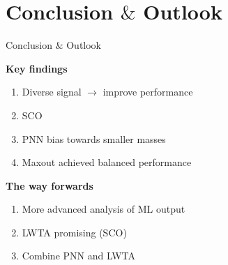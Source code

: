 \documentclass[UKenglish]{beamer}
\begin{document}
\section{Conclusion $\&$ Outlook}
\begin{frame}{Conclusion $\&$ Outlook}
    \tableofcontents[currentsection]
\end{frame}
\begin{frame}
    \textbf{Key findings}
    \begin{enumerate}
        \item Diverse signal $\rightarrow$ improve performance
        \item SCO 
        \item PNN bias towards smaller masses
        \item Maxout achieved balanced performance
    \end{enumerate}
    \vfill
    \textbf{The way forwards}
    \begin{enumerate}
        \item More advanced analysis of ML output
        \item LWTA promising (SCO)
        \item Combine PNN and LWTA
    \end{enumerate}
\end{frame}
\end{document}
